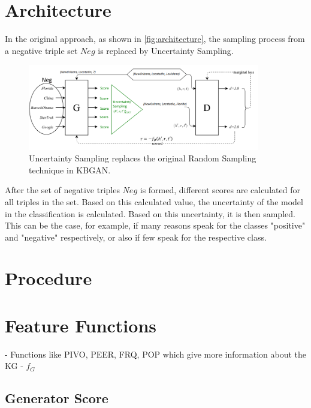 \section{Architecture} \label{sec:architecture}

In the original  approach, as shown in \autoref{fig:architecture}, the sampling process from a negative triple set $Neg$ is replaced by Uncertainty Sampling.
\begin{figure}[t]
  \centering
    \includegraphics[width=0.90\textwidth]{figures/architecture.png}
  \caption{Uncertainty Sampling replaces the original Random Sampling technique in \ac{KBGAN}.}
  \label{fig:architecture}
\end{figure}
After the set of negative triples $Neg$ is formed, different scores are calculated for all triples in the set.
Based on this calculated value, the uncertainty of the model in the classification is calculated.
Based on this uncertainty, it is then sampled. 
This can be the case, for example, if many reasons speak for the classes "positive" and "negative" respectively, or also if few speak for the respective class.

\section{Procedure} \label{sec:procedure}



\section{Feature Functions} \label{sec:featurefunctions}

- Functions like PIVO, PEER, FRQ, POP which give more information about the KG
- $f_G$


\subsection{Generator Score} \label{sec:generatorscore}



